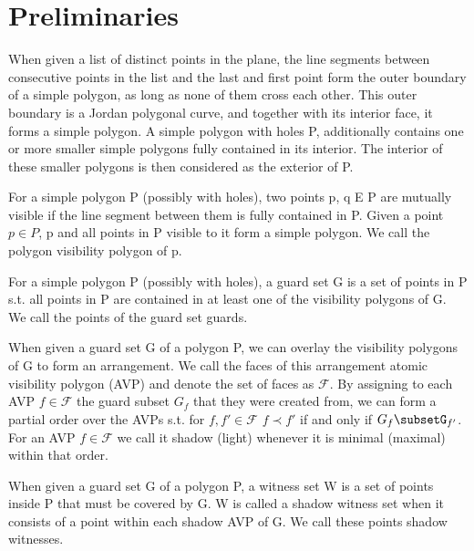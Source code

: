 \chapter{Preliminaries}
\begin{definition}
When given a list of distinct points in the plane, the line segments between consecutive points in the list and the last and first point form the outer boundary of a simple polygon, as long as none of them cross each other. This outer boundary is a Jordan polygonal curve, and together with its interior face, it forms a simple polygon. A simple polygon with holes P, additionally contains one or more smaller simple polygons fully contained in its interior. The interior of these smaller polygons is then considered as the exterior of P.
\end{definition}

\begin{definition}
For a simple polygon P (possibly with holes), two points p, q E P are mutually visible if the line segment between them is fully contained in P. Given a point $p\in P$, p and all points in P visible to it form a simple polygon. We call the polygon visibility polygon of p.
\end{definition}

\begin{definition}
For a simple polygon P (possibly with holes), a guard set G is a set of points in P s.t. all points in P are contained in at least one of the visibility polygons of G. We call the points of the guard set guards.
\end{definition}

\begin{definition}
When given a guard set G of a polygon P, we can overlay the visibility polygons of G to form an arrangement. We call the faces of this arrangement atomic visibility polygon (AVP) and denote the set of faces as $\mathcal{F}$. By assigning to each AVP $f\in\mathcal{F}$ the guard subset $G_{f}$ that they were created from, we can form a partial order over the AVPs s.t. for $f,f'\in\mathcal{F}$ $f\prec f'$ if and only if $G_{f}\subsetG_{f'}$. For an AVP $f\in\mathcal{F}$ we call it shadow (light) whenever it is minimal (maximal) within that order.
\end{definition}

\begin{definition}
When given a guard set G of a polygon P, a witness set W is a set of points inside P that must be covered by G. W is called a shadow witness set when it consists of a point within each shadow AVP of G. We call these points shadow witnesses.
\end{definition}

